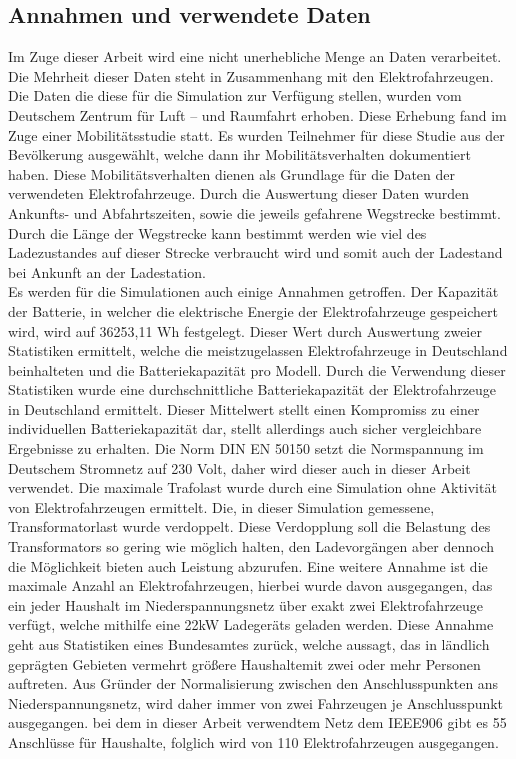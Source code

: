 \subsection{Annahmen und verwendete Daten}
Im Zuge dieser Arbeit wird eine nicht unerhebliche Menge an Daten verarbeitet. Die Mehrheit dieser Daten steht in Zusammenhang mit den Elektrofahrzeugen. Die Daten die diese für die Simulation zur Verfügung stellen, wurden vom Deutschem Zentrum für Luft – und Raumfahrt erhoben. Diese Erhebung fand im Zuge einer Mobilitätsstudie statt. Es wurden Teilnehmer für diese Studie aus der Bevölkerung ausgewählt, welche dann ihr Mobilitätsverhalten dokumentiert haben. Diese Mobilitätsverhalten dienen als Grundlage für die Daten der verwendeten Elektrofahrzeuge. Durch die Auswertung dieser Daten wurden Ankunfts- und Abfahrtszeiten, sowie die jeweils gefahrene Wegstrecke bestimmt. Durch die Länge der Wegstrecke kann bestimmt werden wie viel des Ladezustandes auf dieser Strecke verbraucht wird und somit auch der Ladestand bei Ankunft an der Ladestation.\\
Es werden für die Simulationen auch einige Annahmen getroffen. Der Kapazität der Batterie, in welcher die elektrische Energie der Elektrofahrzeuge gespeichert wird, wird auf 36253,11 Wh festgelegt. Dieser Wert durch Auswertung zweier Statistiken ermittelt, welche die meistzugelassen Elektrofahrzeuge in Deutschland beinhalteten und die Batteriekapazität pro Modell. Durch die Verwendung dieser Statistiken wurde eine durchschnittliche Batteriekapazität der Elektrofahrzeuge in Deutschland ermittelt. Dieser Mittelwert stellt einen Kompromiss zu einer individuellen Batteriekapazität dar, stellt allerdings auch sicher vergleichbare Ergebnisse zu erhalten. Die Norm DIN EN 50150 setzt die Normspannung im Deutschem Stromnetz auf 230 Volt, daher wird dieser auch in dieser Arbeit verwendet. Die maximale Trafolast wurde durch eine Simulation ohne Aktivität von Elektrofahrzeugen ermittelt. Die, in dieser Simulation gemessene, Transformatorlast wurde verdoppelt. Diese Verdopplung soll die Belastung des Transformators so gering wie möglich halten, den Ladevorgängen aber dennoch die Möglichkeit bieten auch Leistung abzurufen. Eine weitere Annahme ist die maximale Anzahl an Elektrofahrzeugen, hierbei wurde davon ausgegangen, das ein jeder Haushalt im Niederspannungsnetz über exakt zwei Elektrofahrzeuge verfügt, welche mithilfe eine 22kW Ladegeräts geladen werden. Diese Annahme geht aus Statistiken eines Bundesamtes zurück, welche aussagt, das in ländlich geprägten Gebieten vermehrt größere Haushaltemit zwei oder mehr Personen auftreten. Aus Gründer der Normalisierung zwischen den Anschlusspunkten ans Niederspannungsnetz, wird daher immer von zwei Fahrzeugen je Anschlusspunkt ausgegangen. bei dem in dieser Arbeit verwendtem Netz dem IEEE906 gibt es 55 Anschlüsse für Haushalte, folglich wird von 110 Elektrofahrzeugen ausgegangen.

